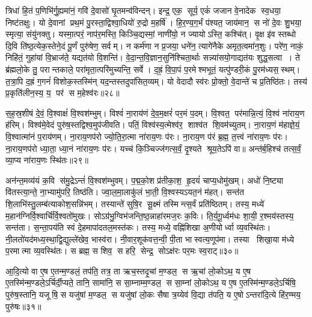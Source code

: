 त्रिधा॑ हि॒तं प॒णिभि॑र्गु॒ह्यमा॑नं॒ गवि॑ दे॒वासो॑ घृ॒तमन्व॑विन्दन्। इन्द्र॒ एक॒ सूर्य॒ एकं॑ जजान वे॒नादेक स्व॒धया॒ निष्ट॑तक्षुः। यो दे॒वानां प्रथ॒मं पु॒रस्ता॒द्विश्वा॒धियो॑ रु॒द्रो म॒हर्\mbox{}षि॑। हि॒र॒ण्य॒ग॒र्भं प॑श्यत॒ जाय॑मान॒ स नो॑ दे॒वः शु॒भया॒ स्मृत्या॒ संयु॑नक्तु। यस्मा॒त्परं॒ नाप॑र॒मस्ति॒ किञ्चि॒द्यस्मां॒ नाणी॑यो॒ न ज्यायोऽस्ति॒ कश्चि॑त्। वृ॒क्ष इ॑व स्तब्धो दि॒वि ति॑ष्ठ॒त्येक॒स्तेने॒दं पू॒र्णं पुरु॑षेण॒ सर्वम्। न कर्म॑णा न प्र॒जया॒ धने॑न॒ त्यागे॑नैके अमृत॒त्वमा॑न॒शुः। परे॑ण॒ नाकं॒ निहि॑तं॒ गुहा॑यां वि॒भ्राज॑ते॒ यद्यत॑यो वि॒शन्ति॑। वे॒दा॒न्त॒वि॒ज्ञान॒सुनि॑श्चिता॒र्थाः सन्न्या॑सयो॒गाद्यत॑यः शुद्ध॒सत्वा। ते ब्र॑ह्मलो॒के तु॒ परान्तकाले॒ परा॑मृता॒त्परि॑मुच्यन्ति॒ सर्वे। द॒ह्रं॒ वि॒पा॒पं प॒रमेश्मभूतं॒ यत्पु॑ण्डरी॒कं पु॒रम॑ध्यस॒स्थम्। त॒त्रा॒पि द॒ह्रं ग॒गनं॑ विशोक॒स्तस्मि॑न् यद॒न्तस्तदुपा॑सित॒व्यम्। यो वेदादौ स्व॑रः प्रो॒क्तो॒ वे॒दान्ते॑ च प्र॒तिष्ठि॑तः। तस्य॑ प्र॒कृति॑लीन॒स्य॒ य॒ पर॑ स म॒हेश्व॑रः॥२८॥
\anuvakamend

स॒ह॒स्र॒शी\sr{}षं दे॒वं॒ वि॒श्वाक्षं॑ वि॒श्वश॑म्भुम्। विश्वं॑ ना॒राय॑णं दे॒व॒म॒क्षरं॑ पर॒मं प॒दम्। 
वि॒श्वत॒ पर॑मान्नि॒त्यं॒ वि॒श्वं ना॑राय॒ण ह॑रिम्। विश्व॑मे॒वेदं पुरु॑ष॒स्तद्विश्व॒मुप॑जीवति। 
पतिं॒ विश्व॑स्य॒\aav{}\aav{}त्मेश्व॑र॒ शाश्व॑त शि॒वम॑च्युतम्। ना॒राय॒णं म॑हाज्ञे॒यं॒ वि॒श्वात्मा॑नं प॒राय॑णम्। ना॒राय॒णप॑रो ज्यो॒ति॒रा॒त्मा ना॑राय॒णः प॑रः। ना॒राय॒ण प॑रं ब्र॒ह्म॒ त॒त्त्वं ना॑राय॒णः प॑रः। ना॒राय॒णप॑रो ध्या॒ता॒ ध्या॒नं ना॑राय॒णः प॑रः। यच्च॑ कि॒ञ्चिज्ज॑गत्स॒र्वं॒ दृ॒श्यते श्रूय॒तेऽपि॑ वा॥ अन्त॑र्ब॒हिश्च॑ तत्स॒र्वं॒ व्या॒प्य ना॑राय॒णः स्थि॑तः॥२९॥

 अन॑न्त॒मव्य॑यं क॒वि स॑मु॒द्रेऽन्तं॑ वि॒श्वश॑म्भुवम्। प॒द्म॒को॒श प्र॑तीका॒श॒ हृ॒दयं॑ चाप्य॒धोमु॑खम्। अधो॑ नि॒ष्ट्या वि॑तस्त्या॒न्ते॒ ना॒भ्यामु॑परि॒ तिष्ठ॑ति। ज्वा॒ल॒मा॒लाकु॑लं भा॒ती॒ वि॒श्वस्यऽ\sav{}यत॒नं म॑हत्। सन्त॑त शि॒लाभि॑स्तु॒\-लम्ब॑त्याकोश॒सन्नि॑भम्। तस्यान्ते॑ सुषि॒र सू॒क्ष्मं तस्मिन्त्स॒र्वं प्रति॑ष्ठितम्। तस्य॒ मध्ये॑ म॒हान॑\-ग्निर्वि॒श्वार्चि॑र्वि॒श्वतो॑मुखः। सोऽग्र॑भु॒ग्विभ॑जन्ति॒ष्ठ॒न्नाहा॑रमज॒रः क॒विः। ति॒र्य॒गू॒र्ध्वम॑धः शा॒यी॒ र॒श्मय॑स्तस्य॒ सन्त॑ता। स॒न्ता॒पय॑ति स्वं दे॒हमापा॑दतल॒मस्त॑कः। तस्य॒ मध्ये॒ वह्नि॑शिखा अ॒णीयोर्ध्वा व्य॒वस्थि॑तः। नी॒लतो॑यद॑\-मध्य॒स्था॒द्वि॒द्युल्ले॑खेव॒ भास्व॑रा। नी॒वार॒शूक॑वत्त॒न्वी॒ पी॒ता भास्वत्य॒णूप॑मा। तस्या शिखा॒या म॑ध्ये प॒रमात्मा व्य॒वस्थि॑तः। स ब्रह्म॒ स शिव॒ स हरि॒ सेन्द्र॒ सोऽक्ष॑रः पर॒मः स्व॒राट्॥३०॥
\anuvakamend[ना॒रा॒य॒णः स्थि॑तो व्य॒वस्थि॑तश्च॒त्वारि॑ च]

आ॒दि॒त्यो वा ए॒ष ए॒तन्म॒ण्डलं॒ तप॑ति॒ तत्र॒ ता ऋच॒स्तदृ॒चां म॒ण्डल॒ स ऋ॒चां लो॒कोऽथ॒ य ए॒ष ए॒तस्मि॑न्म॒ण्डले॒ऽर्चिर्दी॒प्यते॒ तानि॒ सामा॑नि॒ स सा॒म्नाम्म॒ण्डल॒ स सा॒म्नां लो॒कोऽथ॒ य ए॒ष ए॒तस्मि॑न्म॒ण्डले॒ऽर्चिषि॒ पुरु॑ष॒स्तानि॒ यजूषि॒ स यजु॑षां म॒ण्डल॒ स यजु॑षां लो॒कः सैषा त्र॒य्येव॑ वि॒द्या त॑पति॒ य ए॒षोऽन्तरा॑दि॒त्ये हि॑र॒ण्मय॒ पुरु॑षः॥३१॥
\anuvakamend


